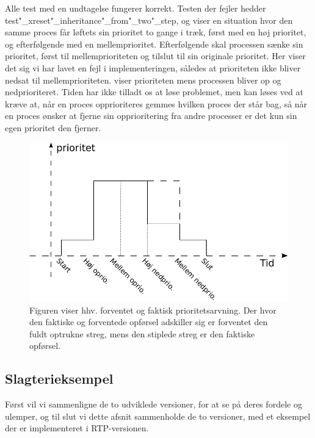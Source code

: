  Alle test med en undtagelse fungerer korrekt. Testen der fejler hedder test"_xreset"_inheritance"_from"_two"_step, og viser en situation hvor den samme proces får løftets sin prioritet to gange i træk, først med en høj prioritet, og efterfølgende med en mellemprioritet. Efterfølgende skal processen sænke sin prioritet, først til  mellemprioriteten og tilslut til sin originale prioritet. Her viser det sig vi har lavet en fejl i implementeringen, således at prioriteten ikke bliver nedsat til mellemprioriteten.  viser prioriteten mens processen bliver op og nedprioriteret. Tiden har ikke tilladt os at løse problemet, men  kan løses ved at kræve at, når en proces opprioriteres gemmes hvilken proces der står bag, så når en proces ønsker at fjerne sin opprioritering fra andre processer er det kun sin egen  prioritet den fjerner.  
 
  
\begin{figure}
 \begin{center}
  \includegraphics[scale=1]{images/priority-inheritance}
	\caption{Figuren viser hhv. forventet og faktisk prioritetsarvning. Der hvor den faktiske og forventede opførsel adskiller sig er forventet den fuldt optrukne streg, mens den stiplede streg er den faktiske opførsel.}
	\label{fig:priority-inheritance}
\end{center}
\end{figure}
  

\subsection{Slagterieksempel}

Først vil vi sammenligne de to udviklede versioner, for at se på deres fordele og ulemper, og til slut vi dette afsnit sammenholde de to versioner, med et  eksempel der er implementeret i RTP-versionen.

